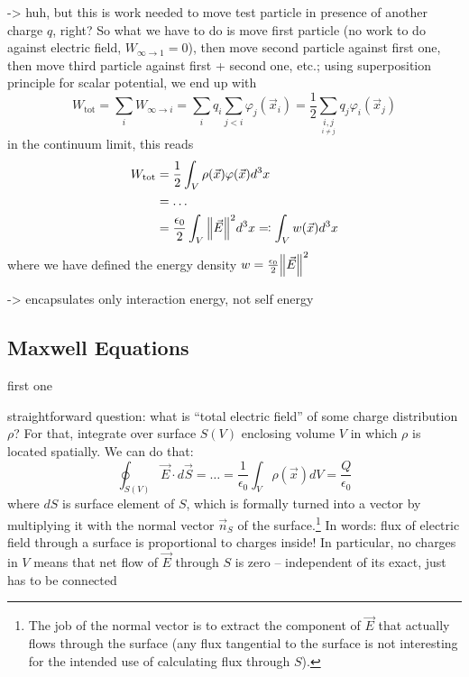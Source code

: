 \documentclass[../class_mech_main.tex]{subfiles}
\begin{document}
-> huh, but this is work needed to move test particle in presence of another charge $q$, right? So what we have to do is move first particle (no work to do against electric field, $W_{\infty \rightarrow 1} = 0$), then move second particle against first one, then move third particle against first + second one, etc.; using superposition principle for scalar potential, we end up with
\begin{equation}
    W_\mathrm{tot} = \sum_i W_{\infty \rightarrow i}
    = \sum_i q_i \sum_{j < i} \varphi_j(\vec{x}_i)
    = \frac{1}{2} \sum_{\underset{i \neq j}{i, j}} q_j \varphi_i(\vec{x}_j)
\end{equation}
in the continuum limit, this reads
\begin{align}
    W_\mathrm{tot} &= \frac{1}{2} \int_V \rho(\vec{x}) \varphi(\vec{x}) d^3x
    \\
    &= \ldots
    \notag\\
    &= \frac{\epsilon_0}{2} \int_V \norm{\vec{E}}^2 d^3x \eqqcolon \int_V w(\vec{x}) d^3x
\end{align}
where we have defined the energy density $w = \frac{\epsilon_0}{2} \norm{\vec{E}}^2$

-> encapsulates only interaction energy, not self energy 



        \subsection{Maxwell Equations}

first one


straightforward question: what is \enquote{total electric field} of some charge distribution $\rho$? For that, integrate over surface $S(V)$ enclosing volume $V$ in which $\rho$ is located spatially. We can do that:
\begin{equation}
    \oint_{S(V)} \vec{E} \cdot d\vec{S} = \ldots = \frac{1}{\epsilon_0} \int_V \rho(\vec{x}) dV = \frac{Q}{\epsilon_0}
\end{equation}
where $dS$ is surface element of $S$, which is formally turned into a vector by multiplying it with the normal vector $\vec{n}_S$ of the surface.\footnote{The job of the normal vector is to extract the component of $\vec{E}$ that actually flows through the surface (any flux tangential to the surface is not interesting for the intended use of calculating flux through $S$).} In words: flux of electric field through a surface is proportional to charges inside! In particular, no charges in $V$ means that net flow of $\vec{E}$ through $S$ is zero -- independent of its exact, just has to be connected
\end{document}
